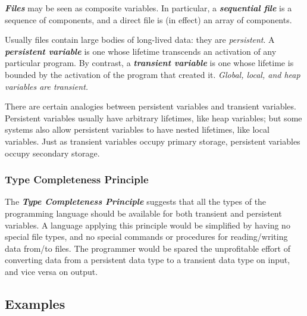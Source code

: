 \begin{multicols}{2}
\textit{\textbf{Files}} may be seen as composite variables. In particular, a \textit{\textbf{sequential file}} is a sequence of components, and a direct file is (in effect) an array of components.

Usually files contain large bodies of long-lived data: they are \textit{persistent}. A \textit{\textbf{persistent variable}} is one whose lifetime transcends an activation of any particular program. By contrast, a \textit{\textbf{transient variable}} is one whose lifetime is bounded by the activation of the program that created it. \textit{Global, local, and heap variables are transient.}

There are certain analogies between persistent variables and transient variables. Persistent variables usually have arbitrary lifetimes, like heap variables; but some systems also allow persistent variables to have nested lifetimes, like local variables. Just as transient variables occupy primary storage, persistent variables occupy secondary storage.

\subsubsection{Type Completeness Principle}

The \textit{\textbf{Type Completeness Principle}} suggests that all the types of the programming language should be available for both transient and persistent variables. A language applying this principle would be simplified by having no special file types, and no special commands or procedures for reading/writing data from/to files. The programmer would be spared the unprofitable effort of converting data from a persistent data type to a transient data type on input, and vice versa on output.

\end{multicols}

\newpage

\subsection{Examples}


